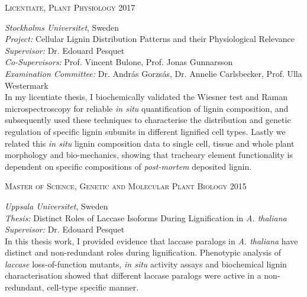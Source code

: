 \documentclass[11pt]{article}
\begin{document}
\textsc{\large{Licentiate, Plant Physiology} \hfill \textsc{2017}}
\begin{addmargin}[24pt]{0pt}
	\textit{Stockholms Universitet}, Sweden \\
	\textit{Project:} Cellular Lignin Distribution Patterns and their Physiological Relevance \\
	\textit{Supervisor:} Dr. Edouard Pesquet \\
	\textit{Co-Supervisors:} Prof. Vincent Bulone, Prof. Jonas Gunnarsson\\
	\textit{Examination Committee:} Dr. András Gorzsás, Dr. Annelie Carlsbecker, Prof. Ulla Westermark
	\vspace{0.1cm} \\
	\small{In my licentiate thesis, I biochemically validated the Wiesner test and Raman microspectroscopy for reliable \textit{in situ} quantification of lignin composition, and subsequently used these techniques to characterise the distribution and genetic regulation of specific lignin subunits in different lignified cell types. Lastly we related this \textit{in situ} lignin composition data to single cell, tissue and whole plant morphology and bio-mechanics, showing that tracheary element functionality is dependent on specific compositions of \textit{post-mortem} deposited lignin.}
\end{addmargin}
\vspace{0.2cm}

\textsc{\large{Master of Science, Genetic and Molecular Plant Biology} \hfill \textsc{2015}}
\begin{addmargin}[24pt]{0pt}
	\textit{Uppsala Universitet}, Sweden \\
	\textit{Thesis:} Distinct Roles of Laccase Isoforms During Lignification in \textit{ A. thaliana}\\
	\textit{Supervisor:} Dr. Edouard Pesquet
	\vspace{0.1cm} \\
	\small{In this thesis work, I provided evidence that laccase paralogs in \textit{A. thaliana} have distinct and non-redundant roles during lignification. Phenotypic analysis of \textit{laccase} loss-of-function mutants, \textit{in situ} activity assays and biochemical lignin characterisation showed that different laccase paralogs were active in a non-redundant, cell-type specific manner.}
\end{addmargin}
\vspace{0.2cm}
\end{document}
